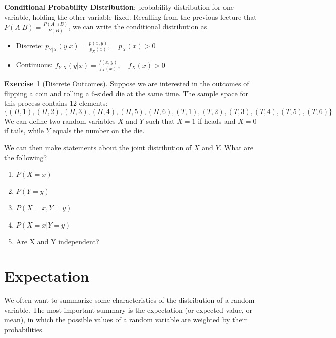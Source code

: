 \documentclass[
]{book}
\providecommand{\tightlist}{%
  \setlength{\itemsep}{0pt}\setlength{\parskip}{0pt}}
\theoremstyle{definition}
\theoremstyle{definition}
\theoremstyle{definition}
\newtheorem{exercise}{Exercise}[chapter]
\theoremstyle{definition}
\theoremstyle{remark}
\begin{document}
\textbf{Conditional Probability Distribution}: probability distribution for one variable, holding the other variable fixed. Recalling from the previous lecture that \(P(A|B)=\frac{P(A\cap B)}{P(B)}\), we can write the conditional distribution as

\begin{itemize}
\tightlist
\item
  Discrete: \(p_{Y|X}(y|x) = \frac{p(x,y)}{p_X(x)}, \quad p_X(x) > 0\)
\item
  Continuous: \(f_{Y|X}(y|x) = \frac{f(x,y)}{f_X(x)},\quad f_X(x) > 0\)
\end{itemize}

\begin{exercise}[Discrete Outcomes]
\protect\hypertarget{exr:unnamed-chunk-269}{}{\label{exr:unnamed-chunk-269} {} }Suppose we are interested in the outcomes of flipping a coin and rolling a 6-sided die at the same time. The sample space for this process contains 12 elements: \[\{(H, 1), (H, 2), (H, 3), (H, 4), (H, 5), (H, 6), (T, 1), (T, 2), (T, 3), (T, 4), (T, 5), (T, 6)\}\] We can define two random variables \(X\) and \(Y\) such that \(X = 1\) if heads and \(X = 0\) if tails, while \(Y\) equals the number on the die.

We can then make statements about the joint distribution of \(X\) and \(Y\). What are the following?

\begin{enumerate}
\def\labelenumi{\arabic{enumi}.}
\tightlist
\item
  \(P(X=x)\)
\item
  \(P(Y=y)\)
\item
  \(P(X=x, Y=y)\)
\item
  \(P(X=x|Y=y)\)
\item
  Are X and Y independent?
\end{enumerate}
\end{exercise}

\hypertarget{expectation}{%
\section{Expectation}\label{expectation}}

We often want to summarize some characteristics of the distribution of a random variable. The most important summary is the expectation (or expected value, or mean), in which the possible values of a random variable are weighted by their probabilities.
\end{document}
